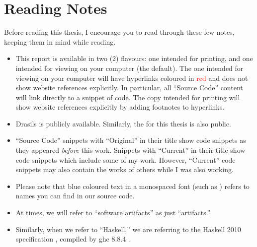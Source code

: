 \chapter{Reading Notes}
\label{chap:reading_notes}

Before reading this thesis, I encourage you to read through these few notes,
keeping them in mind while reading.

\begin{itemize}

      \item This report is available in two (2) flavours: one intended for
            printing, and one intended for viewing on your computer (the
            default). The one intended for viewing on your computer will have
            hyperlinks coloured in \textcolor{red}{red} and does not show
            website references explicitly. In particular, all ``Source Code''
            content will link directly to a snippet of code. The copy intended
            for printing will show website references explicitly by adding
            footnotes to hyperlinks.

      \item Drasils  is publicly
            available. Similarly, the 
            for this thesis is also public.

      \item ``Source Code'' snippets with ``Original'' in their title show code
            snippets as they appeared \textit{before} this work. Snippets with
            ``Current'' in their title show code snippets which include some of
            my work. However, ``Current'' code snippets may also contain the
            works of others while I was also working.

            \sourceCodeBlobHashesTable{}

      \item Please note that blue coloured text in a monospaced font (such as
            \ExampleText{}) refers to names you can find in our source code.

      \item At times, we will refer to ``software artifacts'' as just
            ``artifacts.''

      \item Similarly, when we refer to ``Haskell,'' we are referring to the
            Haskell 2010 specification \cite{Haskell2010}, compiled by \acs{ghc}
            8.8.4 \cite{GHC884}.

\end{itemize}
